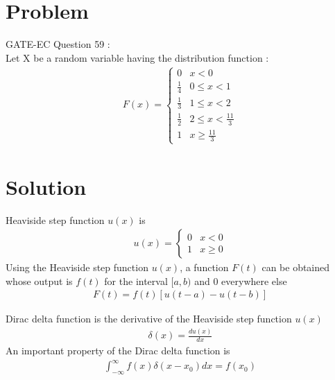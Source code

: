 \documentclass[journal,12pt,twocolumn]{IEEEtran}
\begin{document}
\section*{\textbf{Problem}}
GATE-EC Question 59 : \\
Let X be a random variable having the distribution function :
\begin{align*}
F(x)=   
\begin{cases}
0 & x<0 \\
\frac{1}{4} & 0\le x<1 \\
\frac{1}{3} & 1\le x<2 \\
\frac{1}{2} & 2\le x<\frac{11}{3} \\
1 & x\ge\frac{11}{3}
\end{cases}
\end{align*}
\section*{\textbf{Solution}}

\begin{definition}
Heaviside step function $u(x)$ is 
\begin{align*}
u(x)=               \tag{1} \label{1}
    \begin{cases}
    0 & x<0 \\
    1 & x\geq 0
    \end{cases}
\end{align*}
Using the Heaviside step function $u(x)$, a function $F(t)$ can be obtained whose output is $f(t)$ for the interval $[a,b)$ and $0$ everywhere else
\begin{align*}
    F(t)=f(t)[u(t-a) - u(t-b)] \tag{2} \label{2}
\end{align*}
\end{definition}

\begin{definition}
Dirac delta function is the derivative of the Heaviside step function $u(x)$
\begin{align*}
    \delta(x) = \frac{du(x)}{dx} \tag{3} \label{3}
\end{align*}
An important property of the Dirac delta function is 
\begin{align*}
    \int_{-\infty}^{\infty}f(x)\delta(x-x_0)dx = f(x_0) \tag{4} \label{4}
\end{align*}
\end{definition}
\end{document}
